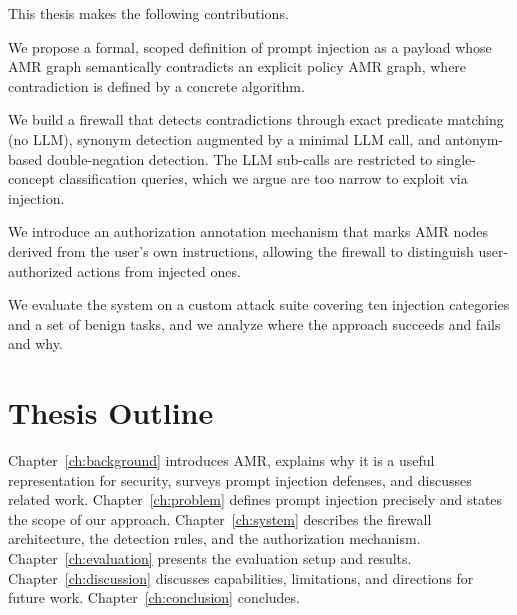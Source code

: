 This thesis makes the following contributions.

We propose a formal, scoped definition of prompt injection as a payload whose AMR graph
semantically contradicts an explicit policy AMR graph, where contradiction is defined by
a concrete algorithm.

We build a firewall that detects contradictions through exact predicate matching (no LLM),
synonym detection augmented by a minimal LLM call, and antonym-based double-negation
detection.
The LLM sub-calls are restricted to single-concept classification queries, which we argue
are too narrow to exploit via injection.

We introduce an authorization annotation mechanism that marks AMR nodes derived from
the user's own instructions, allowing the firewall to distinguish user-authorized actions
from injected ones.

We evaluate the system on a custom attack suite covering ten injection categories and a
set of benign tasks, and we analyze where the approach succeeds and fails and why.

\section{Thesis Outline}
\label{sec:intro-outline}

Chapter~\ref{ch:background} introduces AMR, explains why it is a useful representation
for security, surveys prompt injection defenses, and discusses related work.
Chapter~\ref{ch:problem} defines prompt injection precisely and states the scope of our
approach.
Chapter~\ref{ch:system} describes the firewall architecture, the detection rules, and the
authorization mechanism.
Chapter~\ref{ch:evaluation} presents the evaluation setup and results.
Chapter~\ref{ch:discussion} discusses capabilities, limitations, and directions for future
work.
Chapter~\ref{ch:conclusion} concludes.
